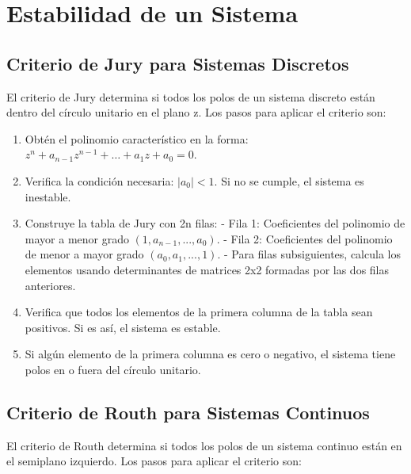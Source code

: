 \documentclass[legalpaper,twocolumn]{article}
\begin{document}
\section*{Estabilidad de un Sistema}

\subsection*{Criterio de Jury para Sistemas Discretos}

El criterio de Jury determina si todos los polos de un sistema discreto están dentro del círculo unitario en el plano z. Los pasos para aplicar el criterio son:

\begin{enumerate}
    \item Obtén el polinomio característico en la forma: \( z^n + a_{n-1} z^{n-1} + \dots + a_1 z + a_0 = 0 \).
    \item Verifica la condición necesaria: \( |a_0| < 1 \). Si no se cumple, el sistema es inestable.
    \item Construye la tabla de Jury con 2n filas:
          - Fila 1: Coeficientes del polinomio de mayor a menor grado $(1, a_{n-1}, ..., a_0)$.
          - Fila 2: Coeficientes del polinomio de menor a mayor grado $(a_0, a_1, ..., 1)$.
          - Para filas subsiguientes, calcula los elementos usando determinantes de matrices 2x2 formadas por las dos filas anteriores.
    \item Verifica que todos los elementos de la primera columna de la tabla sean positivos. Si es así, el sistema es estable.
    \item Si algún elemento de la primera columna es cero o negativo, el sistema tiene polos en o fuera del círculo unitario.
\end{enumerate}

\subsection*{Criterio de Routh para Sistemas Continuos}

El criterio de Routh determina si todos los polos de un sistema continuo están en el semiplano izquierdo. Los pasos para aplicar el criterio son:
\end{document}
